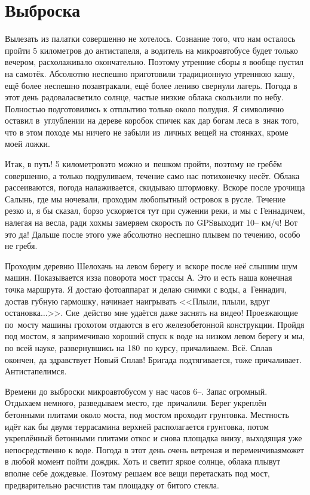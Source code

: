 \chapter{Выброска} 
\vepsianrose

Вылезать из палатки совершенно не хотелось. Сознание того, что нам осталось пройти 5 километров до антистапеля, а водитель на микроавтобусе будет только вечером, расхолаживало окончательно. Поэтому утренние сборы я вообще пустил на самотёк. Абсолютно неспешно приготовили традиционную утреннюю кашу, ещё более неспешно позавтракали, ещё более лениво свернули лагерь. Погода в этот день радовала\mdash светило солнце, частые низкие облака скользили по небу. Полностью подготовились к отплытию только около полудня. Я символично оставил в~углублении на дереве коробок спичек как дар богам леса в~знак того, что в этом походе мы ничего не забыли из~личных вещей на стоянках, кроме моей ложки.

Итак, в путь! 5 километров\mdash это можно и~пешком пройти, поэтому не гребём совершенно, а только подруливаем, течение само нас потихонечку несёт. Облака рассеиваются, погода налаживается, скидываю штормовку. Вскоре после урочища Салынь, где мы ночевали, проходим любопытный островок в русле. Течение резко и, я бы сказал, борзо ускоряется тут при сужении реки, и мы с Геннадичем, налегая на весла, ради хохмы замеряем скорость по GPS\mdash выходит 10\thinspace\nobreakdash-- км/ч! Вот это да! Дальше после этого уже абсолютно неспешно плывем по течению, особо не гребя.

Проходим деревню Шелохачь на левом берегу и~вскоре после неё слышим шум машин. Показывается из\sdash за поворота мост трассы А. Это и есть наша конечная точка маршрута. Я достаю фотоаппарат и делаю снимки с воды, а~Геннадич, достав губную гармошку, начинает наигрывать <<Плыли, плыли, вдруг остановка$\ldots$>>. Сие~действо мне удаётся даже заснять на видео! Проезжающие по~мосту машины грохотом отдаются в его железобетонной конструкции. Пройдя под мостом, я запримечиваю хороший спуск к воде на низком левом берегу и мы, по всей науке, развернувшись на 180\degree~по курсу, причаливаем. Всё. Сплав окончен, да здравствует Новый Сплав! Бригада подтягивается, тоже причаливает. Антистапелимся.

Времени до выброски микроавтобусом у нас часов 6\thinspace\nobreakdash--. Запас огромный. Отдыхаем немного, разведываем место, где~причалили. Берег укреплён бетонными плитами около моста, под мостом проходит грунтовка. Местность идёт как бы двумя террасами\mdash на верхней располагается грунтовка, потом укреплённый бетонными плитами откос и снова площадка внизу, выходящая уже непосредственно к воде. Погода в этот день очень ветреная  и переменчивая\mdash может в любой момент пойти дождик. Хоть и светит яркое солнце, облака плывут вполне себе дождевые. Поэтому решаем все вещи перетаскать под мост, предварительно расчистив там площадку от битого стекла. 

